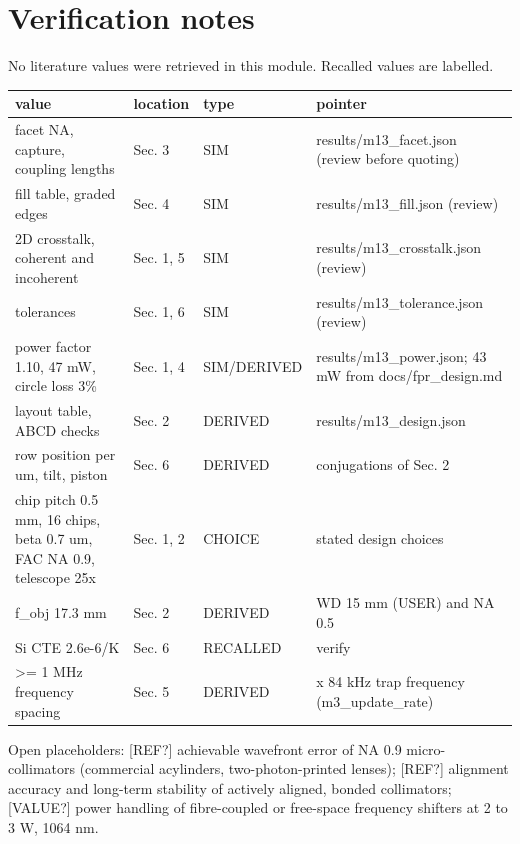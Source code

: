 \hypertarget{verification-notes}{%
\section{Verification notes}\label{stacked_relay-verification-notes}}

No literature values were retrieved in this module. Recalled values are
labelled.

{\footnotesize
\begin{longtable}[]{@{}>{\raggedright\arraybackslash}p{0.321\dimexpr(\linewidth-8\tabcolsep)\relax}>{\raggedright\arraybackslash}p{0.118\dimexpr(\linewidth-8\tabcolsep)\relax}>{\raggedright\arraybackslash}p{0.160\dimexpr(\linewidth-8\tabcolsep)\relax}>{\raggedright\arraybackslash}p{0.401\dimexpr(\linewidth-8\tabcolsep)\relax}@{}}
\toprule\noalign{}
value & location & type & pointer \\
\midrule\noalign{}
\endhead
\bottomrule\noalign{}
\endlastfoot
facet NA, capture, coupling lengths & Sec. 3 & SIM &
results/m13\_facet.json (review before quoting) \\
fill table, graded edges & Sec. 4 & SIM & results/m13\_fill.json
(review) \\
2D crosstalk, coherent and incoherent & Sec. 1, 5 & SIM &
results/m13\_crosstalk.json (review) \\
tolerances & Sec. 1, 6 & SIM & results/m13\_tolerance.json (review) \\
power factor 1.10, 47 mW, circle loss 3\% & Sec. 1, 4 & SIM/DERIVED &
results/m13\_power.json; 43 mW from docs/fpr\_design.md \\
layout table, ABCD checks & Sec. 2 & DERIVED &
results/m13\_design.json \\
row position per um, tilt, piston & Sec. 6 & DERIVED & conjugations of
Sec. 2 \\
chip pitch 0.5 mm, 16 chips, beta 0.7 um, FAC NA 0.9, telescope 25x &
Sec. 1, 2 & CHOICE & stated design choices \\
f\_obj 17.3 mm & Sec. 2 & DERIVED & WD 15 mm (USER) and NA 0.5 \\
Si CTE 2.6e-6/K & Sec. 6 & RECALLED & verify \\
\textgreater= 1 MHz frequency spacing & Sec. 5 & DERIVED & 2 x 84 kHz
trap frequency (m3\_update\_rate) \\
\end{longtable}
}

Open placeholders: {[}REF?{]} achievable wavefront error of NA 0.9
micro-collimators (commercial acylinders, two-photon-printed lenses);
{[}REF?{]} alignment accuracy and long-term stability of actively
aligned, bonded collimators; {[}VALUE?{]} power handling of
fibre-coupled or free-space frequency shifters at 2 to 3 W, 1064 nm.
